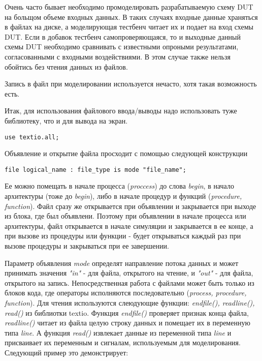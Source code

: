 Очень часто бывает необходимо промоделировать разрабатываемую схему DUT на больщом объеме входных данных. В таких случаях входные данные храняться в файлах на диске, а моделирующая тестбенч читает их и подает на вход схемы DUT. Если в добавок тестбенч самопроверяющаяся, то и выходные данный схемы DUT необходимо сравнивать с известными опроными результатами, согласованными с входными воздействиями. В этом случае также нельзя обойтись без чтения данных из файлов.

Запись в файл при моделировании используется нечасто, хотя такая возможность есть. 

Итак, для использования файлового ввода/выводы надо использовать туже библиотеку, что и для вывода на экран.

\begin{lstlisting}
use textio.all;
\end{lstlisting}

Объявление и открытие файла просходит с помощью следующей конструкции

\begin{lstlisting}
file logical_name : file_type is mode "file_name";
\end{lstlisting}

Ее можно помещать в начале процесса (\emph{proccess}) до слова \emph{begin}, в начало архитектуры (тоже до \emph{begin}), либо в начале процедур и функций (\emph{procedure, function}). Файл сразу же открывается при объявлении и закрывается при выходе из блока, где был объявлени. Поэтому при объявлении в начале процесса или архитектуры, файл открывается в начале симуляции и закрывается в ее конце, а при вызове из процедуры или функции - будет открываться каждый раз при вызове процедуры и закрываться при ее завершении. 

Параметр объявления \emph{mode} определят направление потока данных и может принимать значения \emph{"in"} - для файла, открытого на чтение, и \emph{"out"} - для файла, открытого на запись. Непосредственная работа с файлами может быть только из блоков кода, где операторы исполняются последовательно (\emph{process, procedure, function}). Для чтения используются слеюдующие функции: \emph{endfile(), readline(), read()} из библиотки textio. Функция \emph{endfile()} проверяет признак конца файла, \emph{readline()} читает из файла целую строку данных и помещает их в переменную типа \emph{line}. А функция \emph{read()} извлекает данные из переменной типа \emph{line} и присваивает их переменным и сигналам, используемым для моделирования. Следующий пример это демонстрирует:

